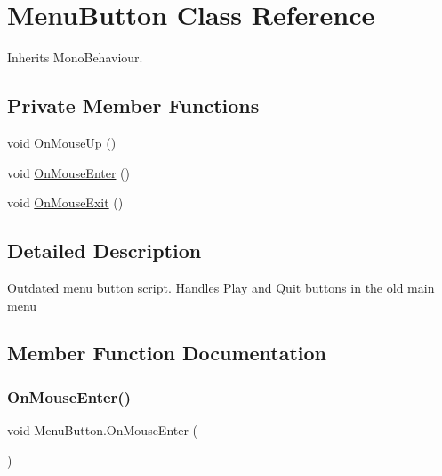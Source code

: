\hypertarget{class_menu_button}{}\section{Menu\+Button Class Reference}
\label{class_menu_button}


Inherits Mono\+Behaviour.

\subsection*{Private Member Functions}
\begin{DoxyCompactItemize}
\item 
void \hyperlink{class_menu_button_a4e61ff19b24c1f1f521b6a80a5688af9}{On\+Mouse\+Up} ()
\item 
void \hyperlink{class_menu_button_a0fb13e66d4eacb0fdd809cd26ebf8782}{On\+Mouse\+Enter} ()
\item 
void \hyperlink{class_menu_button_afae57d1cdf53ab95aaad3ffafcdd5682}{On\+Mouse\+Exit} ()
\end{DoxyCompactItemize}


\subsection{Detailed Description}
Outdated menu button script. Handles Play and Quit buttons in the old main menu 



\subsection{Member Function Documentation}
\mbox{\label{class_menu_button_a0fb13e66d4eacb0fdd809cd26ebf8782}} 
\subsubsection{\texorpdfstring{On\+Mouse\+Enter()}{OnMouseEnter()}}
{\footnotesize\ttfamily void Menu\+Button.\+On\+Mouse\+Enter (\begin{DoxyParamCaption}{ }\end{DoxyParamCaption})\hspace{0.3cm}{\ttfamily [private]}}



